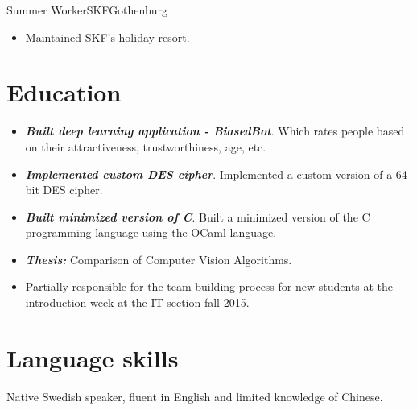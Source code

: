 \documentclass[11pt,a4paper,sans,colorlinks,linkcolor=blue,urlcolor=blue]{moderncv}
\begin{document}
{Summer Worker}{SKF}{Gothenburg}{}
{\begin{itemize}
    \itemsep0.3em
    \setlength{\itemindent}{.25in}
    \item Maintained SKF's holiday resort.
\end{itemize}}

\section{Education}

{\begin{itemize}
    \setlength{\itemindent}{.25in}
    \itemsep0.3em
    \item \textit{\textbf{Built deep learning application - BiasedBot}}. Which rates people based on their attractiveness, trustworthiness, age, etc.
\end{itemize}}{}

{\begin{itemize}
    \setlength{\itemindent}{.25in}
    \itemsep0.3em
    \item \textit{\textbf{Implemented custom DES cipher}}. Implemented a custom version of a 64-bit DES cipher.
    \item \textit{\textbf{Built minimized version of C}}. Built a minimized version of the C programming language using the OCaml language.
\end{itemize}}{}

{\begin{itemize}
    \setlength{\itemindent}{.25in}
    \itemsep0.3em
    \item \textit{\textbf{Thesis:}} Comparison of Computer Vision Algorithms.
    \item Partially responsible for the team building process for new students at the introduction week at the IT section fall 2015.
\end{itemize}}{}

\section{Language skills}
Native Swedish speaker, fluent in English and limited knowledge of Chinese.
\end{document}
